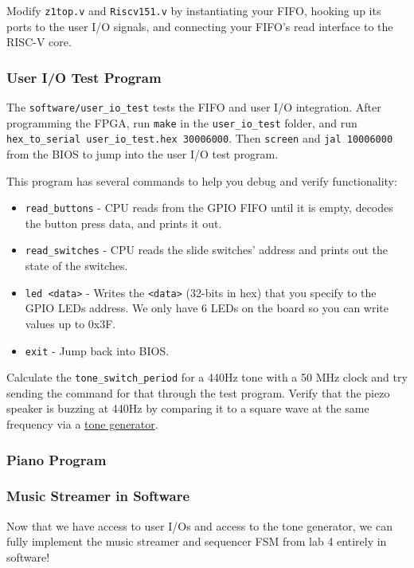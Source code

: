 \documentclass[11pt]{article}
\begin{document}
Modify \verb|z1top.v| and \verb|Riscv151.v| by instantiating your FIFO, hooking up its ports to the user I/O signals, and connecting your FIFO's read interface to the RISC-V core.

\subsubsection{User I/O Test Program}
The \verb|software/user_io_test| tests the FIFO and user I/O integration.
After programming the FPGA, run \verb|make| in the \verb|user_io_test| folder, and run \verb|hex_to_serial user_io_test.hex 30006000|.
Then \verb|screen| and \verb|jal 10006000| from the BIOS to jump into the user I/O test program.

This program has several commands to help you debug and verify functionality:
\begin{itemize}
  \item \verb|read_buttons| - CPU reads from the GPIO FIFO until it is empty, decodes the button press data, and prints it out.
  \item \verb|read_switches| - CPU reads the slide switches' address and prints out the state of the switches.
  \item \verb|led <data>| - Writes the \verb|<data>| (32-bits in hex) that you specify to the GPIO LEDs address. We only have 6 LEDs on the board so you can write values up to 0x3F.
  \item \verb|exit| - Jump back into BIOS.
\end{itemize}


Calculate the \verb|tone_switch_period| for a 440Hz tone with a 50 MHz clock and try sending the command for that through the test program. Verify that the piezo speaker is buzzing at 440Hz by comparing it to a square wave at the same frequency via a \href{http://onlinetonegenerator.com/}{tone generator}.

\subsubsection{Piano Program}

\subsubsection{Music Streamer in Software}
Now that we have access to user I/Os and access to the tone generator, we can fully implement the music streamer and sequencer FSM from lab 4 entirely in software!
\end{document}
